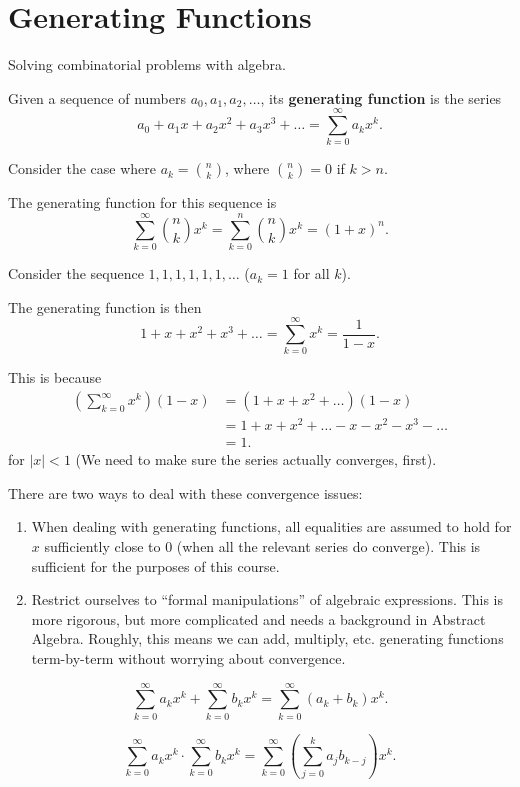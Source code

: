 
\section{Generating Functions}

Solving combinatorial problems with algebra.

\begin{definition}
	Given a sequence of numbers \( a_{0},a_{1},a_{2},\ldots  \), its \textbf{generating function} is the series \[ a_{0}+a_{1}x+a_{2}x^2+a_{3}x^3 + \ldots = \sum_{k=0}^{\infty} a_kx^k .\]
\end{definition}

\begin{eg}
	Consider the case where \( a_k = \binom{n}{k} \), where \( \binom{n}{k}=0 \) if \( k>n \).
\end{eg}

The generating function for this sequence is \[
	\sum_{k=0}^{\infty} \binom{n}{k}x^k = \sum_{k=0}^{n} \binom{n}{k}x^k = (1+x)^n
.\] 

\begin{eg}
	Consider the sequence \( 1,1,1,1,1,1,\ldots  \) (\( a_k =1\) for all \( k \)).
\end{eg}

The generating function is then \[
	1 + x + x^2 + x^3 + \ldots = \sum_{k=0}^{\infty}x^k = \frac{1}{1-x}
.\] 

\begin{note}
	This is because
	\begin{align*}
		\left( \sum_{k=0}^{\infty}x^k  \right)(1-x) &= (1 + x + x^2 + \ldots )(1 - x) \\
		&= 1 + x + x^2 + \ldots - x - x^2 - x^3 - \ldots \\
		&= 1
	.\end{align*}
	for \( |x|<1 \) (We need to make sure the series actually converges, first).
\end{note}

There are two ways to deal with these convergence issues:
\begin{enumerate}
	\item When dealing with generating functions, all equalities are assumed to hold for \( x \) sufficiently close to 0 (when all the relevant series do converge). This is sufficient for the purposes of this course.
	\item Restrict ourselves to ``formal manipulations'' of algebraic expressions. This is more rigorous, but more complicated and needs a background in Abstract Algebra. Roughly, this means we can add, multiply, etc. generating functions term-by-term without worrying about convergence.
\end{enumerate}

\begin{eg}
	\[
		\sum_{k=0}^{\infty} a_kx^k + \sum_{k=0}^{\infty} b_kx^k = \sum_{k=0}^{\infty} (a_k + b_k)x^k
	.\] 
\end{eg}

\begin{eg}
	\[
		\sum_{k=0}^{\infty} a_kx^k \cdot \sum_{k=0}^{\infty} b_kx^k = \sum_{k=0}^{\infty} \left( \sum_{j=0}^{k}a_j b_{k-j}  \right) x^k
	.\] 
\end{eg}
